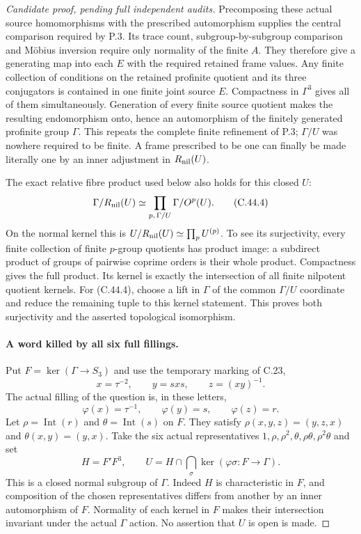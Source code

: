 \begin{proof}[Candidate proof, pending full independent audits]
Precomposing these actual source homomorphisms with the prescribed
automorphism supplies the central comparison required by P.3.
Its trace count, subgroup-by-subgroup comparison and M\"obius
inversion require only normality of the finite $A$. They therefore
give a generating map into each $E$ with the required retained
frame values. Any finite collection of conditions on the retained
profinite quotient and its three conjugators is contained in one
finite joint source $E$. Compactness in $\Gamma^3$ gives all of
them simultaneously. Generation of every finite source quotient
makes the resulting endomorphism onto, hence an automorphism of
the finitely generated profinite group $\Gamma$. This repeats the
complete finite refinement of P.3; $\Gamma/U$ was nowhere required
to be finite. A frame prescribed to be one can finally be made
literally one by an inner adjustment in $R_{\rm nil}(U)$.

The exact relative fibre product used below also holds for this
closed $U$:
\[
 \Gamma/R_{\rm nil}(U)
       \simeq\prod_{p,\,\Gamma/U}\Gamma/O^p(U).          \tag{C.44.4}
\]
On the normal kernel this is
$U/R_{\rm nil}(U)\simeq\prod_p U^{(p)}$. To see its
surjectivity, every finite collection of finite $p$-group
quotients has product image: a subdirect product of groups of
pairwise coprime orders is their whole product. Compactness gives
the full product. Its kernel is exactly the intersection of all
finite nilpotent quotient kernels. For (C.44.4), choose a lift in
$\Gamma$ of the common $\Gamma/U$ coordinate and reduce the
remaining tuple to this kernel statement. This proves both
surjectivity and the asserted topological isomorphism.

\paragraph{A word killed by all six full fillings.}
Put $F=\ker(\Gamma\to S_3)$ and use the temporary marking of C.23,
\[
 x=\tau^{-2},\qquad y=sxs,\qquad z=(xy)^{-1}.
\]
The actual filling of the question is, in these letters,
\[
 \varphi(x)=\tau^{-1},\qquad\varphi(y)=s,\qquad
                         \varphi(z)=r.                \tag{C.44.5}
\]
Let $\rho=\operatorname{Int}(r)$ and
$\theta=\operatorname{Int}(s)$ on $F$. They satisfy
$\rho(x,y,z)=(y,z,x)$ and $\theta(x,y)=(y,x)$.
Take the six actual representatives
$1,\rho,\rho^2,\theta,\rho\theta,\rho^2\theta$ and set
\[
 H=F'F^3,\qquad
 U=H\cap\bigcap_\sigma\ker(\varphi\sigma:F\to\Gamma).
                                                               \tag{C.44.6}
\]
This is a closed normal subgroup of $\Gamma$. Indeed $H$ is
characteristic in $F$, and composition of the chosen representatives
differs from another by an inner automorphism of $F$. Normality
of each kernel in $F$ makes their intersection invariant under
the actual $\Gamma$ action. No assertion that $U$ is open is made.


\end{proof}
